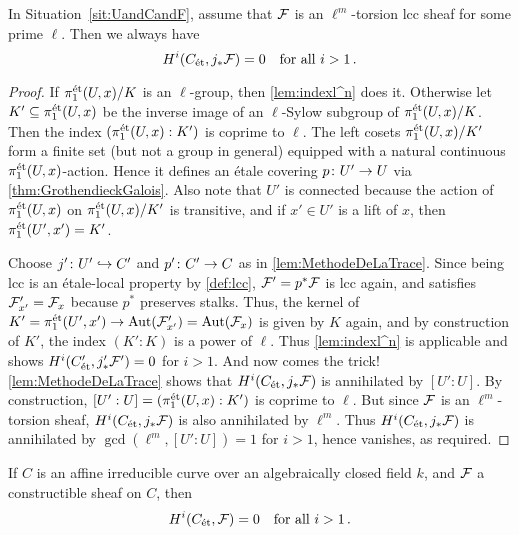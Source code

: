 \begin{lem}\label{lem:Hij_*F=0}
	In Situation~\cref{sit:UandCandF}, assume that $\mathcal{F}$ is an $\ell^m$-torsion lcc sheaf for some prime $\ell$. Then we always have
	\begin{equation*}
		H^i(C_{\mathrm{\acute{e}t}},j_*\mathcal{F})=0\quad\text{for all }i>1\,.
	\end{equation*}
\end{lem}
\begin{proof}
	If $\pi_1^{\mathrm{\acute{e}t}}(U,x)/K$ is an $\ell$-group, then \cref{lem:indexl^n} does it. Otherwise let $K'\subseteq \pi_1^{\mathrm{\acute{e}t}}(U,x)$ be the inverse image of an $\ell$-Sylow subgroup of $\pi_1^{\mathrm{\acute{e}t}}(U,x)/K$. Then the index $(\pi_1^{\mathrm{\acute{e}t}}(U,x):K')$ is coprime to $\ell$. The left cosets $\pi_1^{\mathrm{\acute{e}t}}(U,x)/K'$ form a finite set (but not a group in general) equipped with a natural continuous $\pi_1^{\mathrm{\acute{e}t}}(U,x)$-action. Hence it defines an étale covering $p\colon U'\morphism U$ via \cref{thm:GrothendieckGalois}. Also note that $U'$ is connected because the action of $\pi_1^{\mathrm{\acute{e}t}}(U,x)$ on $\pi_1^{\mathrm{\acute{e}t}}(U,x)/K'$ is transitive, and if $x'\in U'$ is a lift of $x$, then $\pi_1^{\mathrm{\acute{e}t}}(U',x')=K'$.
	
	Choose $j'\colon U'\monomorphism C'$ and $p'\colon C'\morphism C$ as in \cref{lem:MethodeDeLaTrace}. Since being lcc is an étale-local property by \cref{def:lcc}, $\mathcal{F}'= p^*\mathcal{F}$ is lcc again, and satisfies $\mathcal{F}'_{x'}=\mathcal{F}_x$ because $p^*$ preserves stalks. Thus, the kernel of $K'=\pi_1^\et(U',x')\morphism \Aut(\Ff'_{x'})=\Aut(\Ff_x)$ is given by $K$ again, and by construction of $K'$, the index $(K':K)$ is a power of $\ell$. Thus \cref{lem:indexl^n} is applicable and shows $H^i(C'_{\mathrm{\acute{e}t}},j'_*\mathcal{F}')=0$ for $i>1$. And now comes the trick! \cref{lem:MethodeDeLaTrace} shows that $H^i(C_{\mathrm{\acute{e}t}},j_*\mathcal{F})$ is annihilated by $[U':U]$. By construction, $[U':U]=(\pi_1^{\mathrm{\acute{e}t}}(U,x):K')$ is coprime to $\ell$. But since $\mathcal{F}$ is an $\ell^m$-torsion sheaf, $H^i(C_{\mathrm{\acute{e}t}},j_*\mathcal{F})$ is also annihilated by $\ell^m$. Thus $H^i(C_{\mathrm{\acute{e}t}},j_*\mathcal{F})$ is annihilated by $\gcd(\ell^m,[U':U])=1$ for $i>1$, hence vanishes, as required.
\end{proof}
\begin{lem}\label{lem:HiCtorsion=0}
	If $C$ is an affine irreducible curve over an algebraically closed field $k$, and $\mathcal{F}$ a constructible sheaf on $C$, then
	\begin{equation*}
		H^i(C_{\mathrm{\acute{e}t}},\mathcal{F})=0\quad\text{for all }i>1\,.
	\end{equation*}
\end{lem}
